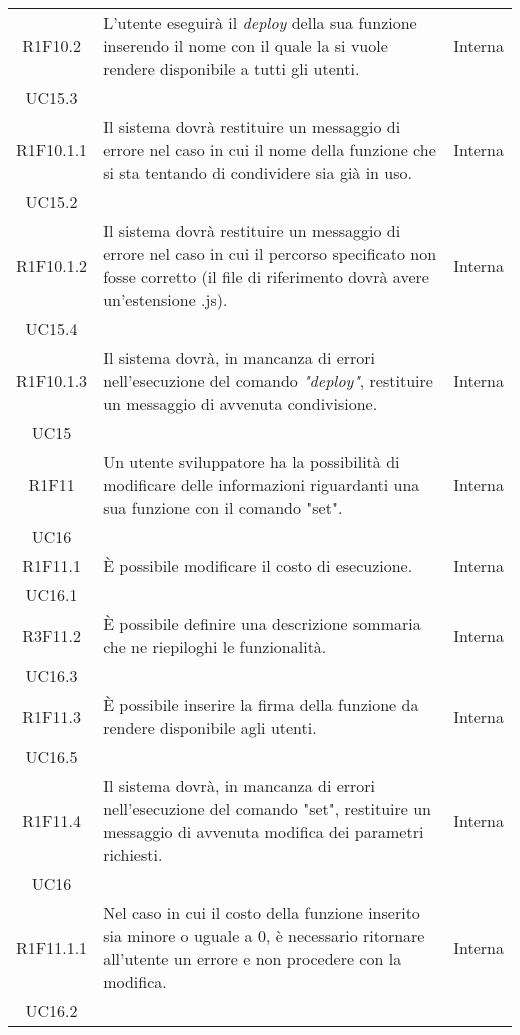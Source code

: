 \begin{longtable}{|c|p{8cm}|C{2cm}|}
	R1F10.2 &  L'utente eseguirà il \textit{deploy\glo} della sua funzione inserendo il nome con il quale la si vuole rendere disponibile a tutti gli utenti. & \centering Interna \\ UC15.3 \tabularnewline
	
	R1F10.1.1 &  Il sistema dovrà restituire un messaggio di errore nel caso in cui il nome della funzione che si sta tentando di condividere sia già in uso. & \centering Interna \\ UC15.2 \tabularnewline
	
	R1F10.1.2 &  Il sistema dovrà restituire un messaggio di errore nel caso in cui il percorso specificato non fosse corretto (il file di riferimento dovrà avere un'estensione .js). & \centering Interna \\ UC15.4 \tabularnewline
	
	R1F10.1.3 &  Il sistema dovrà, in mancanza di errori nell'esecuzione del comando \textit{"deploy\glos"}, restituire un messaggio di avvenuta condivisione. & \centering Interna \\ UC15 \tabularnewline
	
	R1F11 &  Un utente sviluppatore ha la possibilità di modificare delle informazioni riguardanti una sua funzione con il comando "set". & \centering Interna \\ UC16 \tabularnewline
	
	R1F11.1 &  È possibile modificare il costo di esecuzione. & \centering Interna \\ UC16.1 \tabularnewline
	
	R3F11.2 &  È possibile definire una descrizione sommaria che ne riepiloghi le funzionalità. & \centering Interna \\ UC16.3 \tabularnewline
	
	R1F11.3 &  È possibile inserire la firma della funzione da rendere disponibile agli utenti. & \centering Interna \\ UC16.5 \tabularnewline
	
	R1F11.4 &  Il sistema dovrà, in mancanza di errori nell'esecuzione del comando "set", restituire un messaggio di avvenuta modifica dei parametri richiesti. & \centering Interna \\ UC16 \tabularnewline
	
	R1F11.1.1 &  Nel caso in cui il costo della funzione inserito sia minore o uguale a 0, è necessario ritornare all'utente un errore e non procedere con la modifica. & \centering Interna \\ UC16.2 \tabularnewline
	

\end{longtable}
